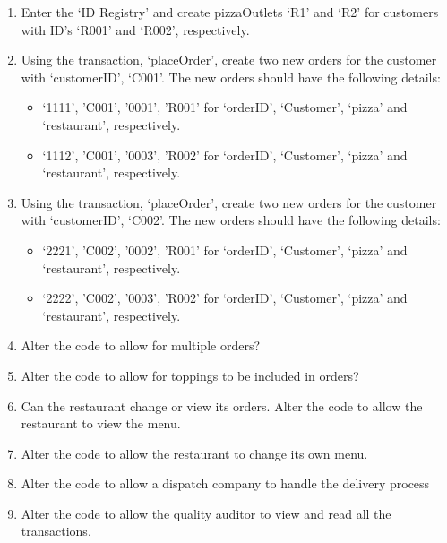 \begin{enumerate}
	\item Enter the `ID Registry' and create pizzaOutlets `R1' and `R2' for customers with ID's `R001' and `R002', respectively.
	\item Using the transaction, `placeOrder', create two new orders for the customer with `customerID', `C001'. The new orders should have the following details:
		\begin{itemize}
			\item `1111', 'C001', '0001', 'R001' for `orderID', `Customer', `pizza' and `restaurant', respectively.
			\item `1112', 'C001', '0003', 'R002' for `orderID', `Customer', `pizza' and `restaurant', respectively.
		\end{itemize}
	\item Using the transaction, `placeOrder', create two new orders for the customer with `customerID', `C002'. The new orders should have the following details:
		\begin{itemize}
			\item `2221', 'C002', '0002', 'R001' for `orderID', `Customer', `pizza' and `restaurant', respectively.
			\item `2222', 'C002', '0003', 'R002' for `orderID', `Customer', `pizza' and `restaurant', respectively.
		\end{itemize}
	\item Alter the code to allow for multiple orders?
	\item Alter the code to allow for toppings to be included in orders?
	\item Can the restaurant change or view its orders. Alter the code to allow the restaurant to view the menu.
	\item Alter the code to allow the restaurant to change its own menu.
	\item Alter the code to allow a dispatch company to handle the delivery process
	\item Alter the code to allow the quality auditor to view and read all the transactions.
	
		
\end{enumerate}
